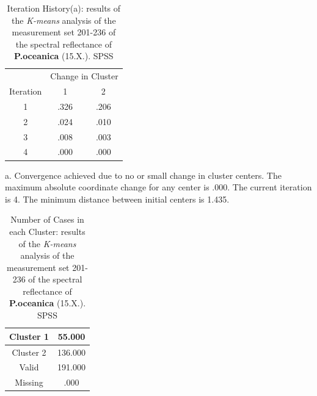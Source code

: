 \documentclass[10pt, a4paper]{article}
\begin{document}
\begin{appendices}
\begin{table}[htbp]
\caption{Iteration History(a): results of the \textit{K-means} analysis of the measurement set 201-236 of the spectral reflectance of \textbf{P.oceanica} (15.X.). SPSS}
\label{tab:14}
\begin{center}
\begin{tabular}{|c|c|c|}
\hline\hline
& \multicolumn{2}{|c|}{Change in Cluster} \\
 Iteration & 1 & 2 \\ \hline\hline
1 &	.326 &	.206 \\ \hline
2 &	.024 & 	.010 \\ \hline
3 &	.008 &	.003 \\ \hline
4 &	.000 &	.000 \\ \hline
\end{tabular}
\end{center}
a. Convergence achieved due to no or small change in cluster centers. The maximum absolute coordinate change for any center is .000. The current iteration is 4. The minimum distance between initial centers is 1.435.
\label{fig:5}
\end{table}

\begin{table}[H]
\caption{Number of Cases in each Cluster: results of the \textit{K-means} analysis of the measurement set 201-236 of the spectral reflectance of \textbf{P.oceanica} (15.X.). SPSS}
\label{tab:15}
\begin{center}
\begin{tabular}{|c|c|}
\hline\hline
Cluster 1 & 55.000 \\ \hline
Cluster 2 & 136.000 \\ \hline
Valid &	191.000 \\ \hline
Missing & .000 \\ \hline
\end{tabular}
\end{center}
\label{fig:5}
\end{table}
\pagebreak


\end{appendices}
\end{document}
